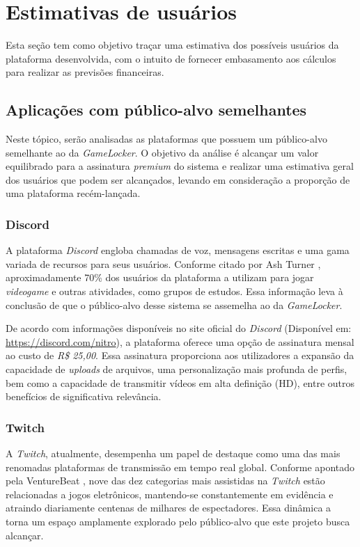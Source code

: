 \section{Estimativas de usuários}

Esta seção tem como objetivo traçar uma estimativa dos possíveis usuários da plataforma desenvolvida, com o intuito de fornecer embasamento aos cálculos para realizar as previsões financeiras.

\subsection{Aplicações com público-alvo semelhantes}\label{subsec::publico-alvo_semelhante}

Neste tópico, serão analisadas as plataformas que possuem um público-alvo semelhante ao da \textit{GameLocker}. O objetivo da análise é alcançar um valor equilibrado para a assinatura \textit{premium} do sistema e realizar uma estimativa geral dos usuários que podem ser alcançados, levando em consideração a proporção de uma plataforma recém-lançada.

\subsubsection{Discord}

A plataforma \textit{\gls{Discord}} engloba chamadas de voz, mensagens escritas e uma gama variada de recursos para seus usuários. Conforme citado por Ash Turner \cite{discord_users}, aproximadamente 70\% dos usuários da plataforma a utilizam para jogar \textit{videogame} e outras atividades, como grupos de estudos. Essa informação leva à conclusão de que o público-alvo desse sistema se assemelha ao da \textit{GameLocker}.

De acordo com informações disponíveis no site oficial do \textit{\gls{Discord}} (Disponível em: \url{https://discord.com/nitro}), a plataforma oferece uma opção de assinatura mensal ao custo de \textit{R\$ 25,00}. Essa assinatura proporciona aos utilizadores a expansão da capacidade de \textit{uploads} de arquivos, uma personalização mais profunda de perfis, bem como a capacidade de transmitir vídeos em alta definição (HD), entre outros benefícios de significativa relevância.

\subsubsection{Twitch}

A \textit{\gls{Twitch}}, atualmente, desempenha um papel de destaque como uma das mais renomadas plataformas de transmissão em tempo real global. Conforme apontado pela VentureBeat \cite{twitch_categories}, nove das dez categorias mais assistidas na \textit{\gls{Twitch}} estão relacionadas a jogos eletrônicos, mantendo-se constantemente em evidência e atraindo diariamente centenas de milhares de espectadores. Essa dinâmica a torna um espaço amplamente explorado pelo público-alvo que este projeto busca alcançar.

